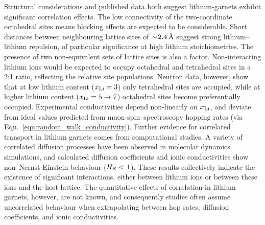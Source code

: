 \documentclass[aps,prb,twocolumn,superscriptaddress,reprint]{revtex4-1}
\newcommand{\xLi}{x_\m{Li}}
\newcommand{\angstrom}{\mbox{\normalfont\AA}}
\begin{document}
Structural considerations and published data both suggest lithium-garnets  exhibit significant correlation effects. The low connectivity of the two-coordinate octahedral sites means blocking effects are expected to be considerable.\cite{AwakaEtAl_ChemLett2011} Short distances between neighbouring lattice sites of $\sim\!2.4\,\mathrm{\angstrom}$ suggest strong lithium--lithium repulsion, of particular significance at high lithium stoichiometries.\cite{OCallaghanAndCussen_ChemComm2007,OCallaghanAndCussen_SolStatSci2008,Cussen_JMaterChem2010,WangEtAl_SolStatIonics2014} The presence of two non-equivalent sets of lattice sites is also a factor. Non-interacting lithium ions would be expected to occupy octahedral and tetrahedral sites in a 2:1 ratio, reflecting the relative site populations. 
Neutron data, however, show that at low lithium content ($\xLi=3$) only tetrahedral sites are occupied,\cite{OCallaghanEtAl_ChemMater2006} while at higher lithium content ($\xLi=5\to7$) octahedral sites become preferentially occupied.\cite{Cussen_JMaterChem2010,ThangaduraiEtAl_JPhysChemLett2015} Experimental conductivities depend non-linearly on $\xLi$,\cite{ThompsonEtAl_AdvEnergyMater2015} and deviate from ideal values predicted from muon-spin--spectroscopy hopping rates (via Eqn.~\ref{eqn:random_walk_conductivity}).\cite{NozakiEtAl_SolStatIonics2014} Further evidence for correlated transport in lithium garnets comes from computational studies. A variety of correlated diffusion processes have been observed in molecular dynamics simulations,\cite{JalemEtAl_ChemMater2013, MeierEtAl_JPhysChemC2014,KlenkAndLai_PhysChemChemPhys2015, BurbanoEtAl_PhysRevLett2016} and calculated diffusion coefficients and ionic conductivities show non--Nernst-Einstein behaviour ($H_{\mathrm{R}}<1$).\cite{KlenkAndLai_SolStatIonics2016} These results collectively indicate the existence of significant interactions, either between lithium ions or between these ions and the host lattice. The quantitative effects of correlation in lithium garnets, however, are not known, and consequently studies often assume uncorrelated behaviour when extrapolating between hop rates, diffusion coefficients, and ionic conductivities.\cite{KuhnEtAl_PhysRevB2011,KuhnEtAl_JPhys-CondensMat2011,MiaraEtAl_ChemMater2013,Rustad_arXiv2016,GuEtAl_SolStatIonics2015,NozakiEtAl_SolStatIonics2014,ZeierEtAl_ACSApplMaterInt2014,JalemEtAl_ChemMater2013,AdamsAndRao_JMaterChem2012,DuvelEtAl_JPhysChemC2012,NarayananEtAl_RSCAdv2012,RamzyAndThangadurai_ACSApplMaterInt2010,AmoresEtAl_JMaterChemA2016}
\end{document}
